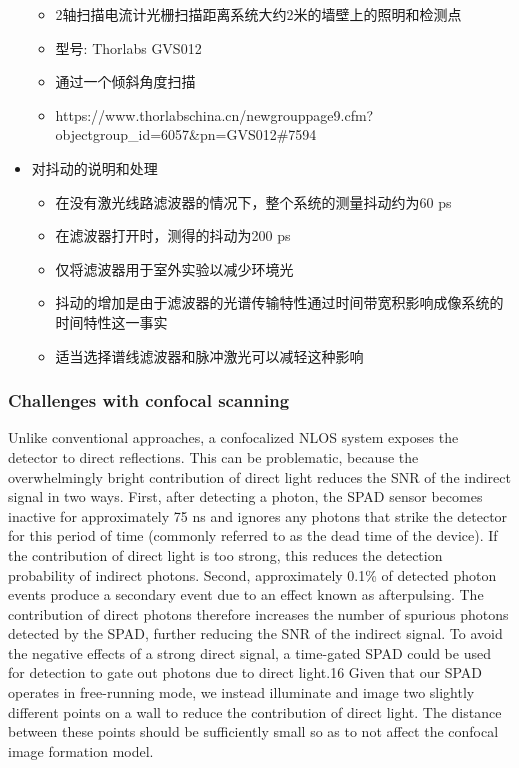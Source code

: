 \documentclass[11pt]{article}
\providecommand{\tightlist}{%
      \setlength{\itemsep}{0pt}\setlength{\parskip}{0pt}}
\begin{document}
\begin{itemize}
  \begin{itemize}
  \tightlist
  \item
    2轴扫描电流计光栅扫描距离系统大约2米的墙壁上的照明和检测点
  \item
    型号: Thorlabs GVS012
  \item
    通过一个倾斜角度扫描
  \item
    https://www.thorlabschina.cn/newgrouppage9.cfm?objectgroup\_id=6057\&pn=GVS012\#7594
  \end{itemize}
\item
  对抖动的说明和处理

  \begin{itemize}
  \tightlist
  \item
    在没有激光线路滤波器的情况下，整个系统的测量抖动约为60 ps
  \item
    在滤波器打开时，测得的抖动为200 ps
  \item
    仅将滤波器用于室外实验以减少环境光
  \item
    抖动的增加是由于滤波器的光谱传输特性通过时间带宽积影响成像系统的时间特性这一事实
  \item
    适当选择谱线滤波器和脉冲激光可以减轻这种影响
  \end{itemize}
\end{itemize}

    \subsubsection{Challenges with confocal
scanning}\label{challenges-with-confocal-scanning}

Unlike conventional approaches, a confocalized NLOS system exposes the
detector to direct reflections. This can be problematic, because the
overwhelmingly bright contribution of direct light reduces the SNR of
the indirect signal in two ways. First, after detecting a photon, the
SPAD sensor becomes inactive for approximately 75 ns and ignores any
photons that strike the detector for this period of time (commonly
referred to as the dead time of the device). If the contribution of
direct light is too strong, this reduces the detection probability of
indirect photons. Second, approximately 0.1\% of detected photon events
produce a secondary event due to an effect known as afterpulsing. The
contribution of direct photons therefore increases the number of
spurious photons detected by the SPAD, further reducing the SNR of the
indirect signal. To avoid the negative effects of a strong direct
signal, a time-gated SPAD could be used for detection to gate out
photons due to direct light.16 Given that our SPAD operates in
free-running mode, we instead illuminate and image two slightly
different points on a wall to reduce the contribution of direct light.
The distance between these points should be sufficiently small so as to
not affect the confocal image formation model.
\end{document}

